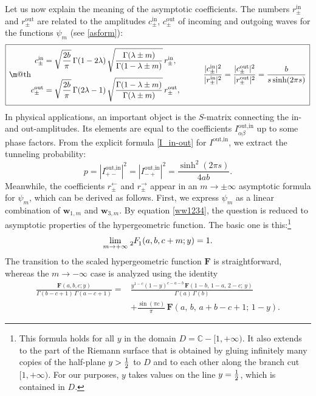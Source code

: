 \documentclass[12pt]{article}
\makeatletter
\newcommand*{\wideboxed}[1]{\setlength{\fboxsep}{1ex}%
  \fbox{\m@th$\displaystyle#1$}}
\newcommand{\hgf}{%
\,\tensor[_{2\kern-1.2pt}]{F}{_{\kern-0.8pt 1}}\kern-1.2pt}
\newcommand{\hgfs}{\mathbf{F}}
\newcommand{\CC}{\mathbb{C}}
\let\Re\relax\DeclareMathOperator{\Re}{Re}
\newcommand{\lar}{{\leftarrow}}
\newcommand{\rar}{{\rightarrow}}
\newcommand{\IN}{\text{in}}
\newcommand{\OUT}{\text{out}}
\newcommand{\ww}{\mathbf{w}}
\makeatother
\begin{document}
Let us now explain the meaning of the asymptotic coefficients. The numbers $r^{\IN}_{\pm}$ and $r^{\OUT}_{\pm}$ are related to the amplitudes $c^{\IN}_{\pm}$, $c^{\OUT}_{\pm}$ of incoming and outgoing waves for the functions $\psi_m$ (see \eqref{asform}):
\begin{equation} \label{asymco}
\wideboxed{
\begin{aligned}
c_{\pm}^{\IN}&=\sqrt{\frac{2b}{\pi}}\,\Gamma(1-2\lambda)\,
\sqrt{\frac{\Gamma(\lambda\pm m)}{\Gamma(1-\lambda\pm m)}}\,
r_{\pm}^{\IN},\\[3pt]
c_{\pm}^{\OUT}&=\sqrt{\frac{2b}{\pi}}\,\Gamma(2\lambda-1)\,
\sqrt{\frac{\Gamma(1-\lambda\pm m)}{\Gamma(\lambda\pm m)}}\,
r_{\pm}^{\OUT},
\end{aligned}\qquad\quad
\frac{|c_{\pm}^{\IN}|^2}{|r_{\pm}^{\IN}|^2}
=\frac{|c_{\pm}^{\OUT}|^2}{|r_{\pm}^{\OUT}|^2}
=\frac{b}{s\sinh(2\pi s)}
}
\end{equation}
In physical applications, an important object is the $S$-matrix connecting the in- and out-amplitudes. Its elements are equal to the coefficients $I^{\OUT,\IN}_{\alpha\beta}$ up to some phase factors. From the explicit formula \eqref{I_in-out} for $I^{\OUT,\IN}$, we extract the tunneling probability:
\begin{equation}
p=|I^{\OUT,\IN}_{+-}|^2=|I^{\OUT,\IN}_{-+}|^2=\frac{\sinh^2(2\pi s)}{4ab}.
\end{equation}
Meanwhile, the coefficients $r^{\lar}_{\pm}$ and $r^{\rar}_{\pm}$ appear in an $m\to\pm\infty$ asymptotic formula for $\psi_m$, which can be derived as follows. First, we express $\psi_m$ as a linear combination of $\ww_{1,m}$ and $\ww_{3,m}$. By equation \eqref{ww1234}, the question is reduced to asymptotic properties of the hypergeometric function. The basic one is this:\footnote{This formula holds for all $y$ in the domain $D=\CC-[1,+\infty)$. It also extends to the part of the Riemann surface that is obtained by gluing infinitely many copies of the half-plane $\Re y>\frac{1}{2}$ to $D$ and to each other along the branch cut $[1,+\infty)$. For our purposes, $y$ takes values on the line $\Re y=\frac{1}{2}$, which is contained in $D$.}
\begin{equation}
\lim_{m\to+\infty}\hgf(a,b,c+m;y)=1.
\end{equation}
The transition to the scaled hypergeometric function $\hgfs$ is straightforward, whereas the $m\to-\infty$ case is analyzed using the identity
\begin{equation}
\begin{aligned}
\frac{\hgfs(a,b,c;y)}{\Gamma(b-c+1)\,\Gamma(a-c+1)}
={}&\frac{y^{1-c}(1-y)^{c-a-b}\,
\hgfs(1-b,\,1-a,\,2-c;\,y)}{\Gamma(a)\,\Gamma(b)}\\
&+\frac{\sin(\pi c)}{\pi}\,\hgfs(a,\,b,\,a+b-c+1;\,1-y).
\end{aligned}
\end{equation}
\end{document}
